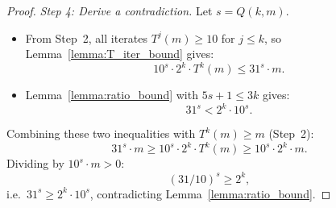 \begin{proof}
\emph{Step 4: Derive a contradiction.}
Let $s = Q(k, m)$.
\begin{itemize}
  \item From Step~2, all iterates $T^j(m) \ge 10$ for $j \le k$, so Lemma~\ref{lemma:T_iter_bound} gives:
    \[
      10^s \cdot 2^k \cdot T^k(m) \le 31^s \cdot m.
    \]
  \item Lemma~\ref{lemma:ratio_bound} with $5s + 1 \le 3k$ gives:
    \[
      31^s < 2^k \cdot 10^s.
    \]
\end{itemize}
Combining these two inequalities with $T^k(m) \ge m$ (Step~2):
\[
  31^s \cdot m \ge 10^s \cdot 2^k \cdot T^k(m) \ge 10^s \cdot 2^k \cdot m.
\]
Dividing by $10^s \cdot m > 0$:
\[
  (31/10)^s \ge 2^k,
\]
i.e.\ $31^s \ge 2^k \cdot 10^s$, contradicting Lemma~\ref{lemma:ratio_bound}.
\end{proof}
